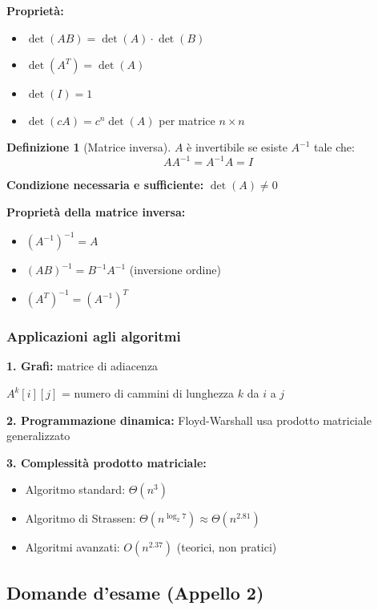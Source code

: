 \documentclass[a4paper, 11pt]{article}
\theoremstyle{definition}
\newtheorem{definizione}{Definizione}[section]
\theoremstyle{remark}
\theoremstyle{remark}
\begin{document}
	\textbf{Proprietà:}
	\begin{itemize}
		\item $\det(AB) = \det(A) \cdot \det(B)$
		\item $\det(A^T) = \det(A)$
		\item $\det(I) = 1$
		\item $\det(cA) = c^n \det(A)$ per matrice $n \times n$
	\end{itemize}
	
	\begin{definizione}[Matrice inversa]
		$A$ è invertibile se esiste $A^{-1}$ tale che:
		\[
		AA^{-1} = A^{-1}A = I
		\]
		
		\textbf{Condizione necessaria e sufficiente:} $\det(A) \neq 0$
	\end{definizione}
	
	\textbf{Proprietà della matrice inversa:}
	\begin{itemize}
		\item $(A^{-1})^{-1} = A$
		\item $(AB)^{-1} = B^{-1}A^{-1}$ (inversione ordine)
		\item $(A^T)^{-1} = (A^{-1})^T$
	\end{itemize}
	
	\subsubsection{Applicazioni agli algoritmi}
	
	\textbf{1. Grafi:} matrice di adiacenza
	
	$A^k[i][j]$ = numero di cammini di lunghezza $k$ da $i$ a $j$
	
	\textbf{2. Programmazione dinamica:} Floyd-Warshall usa prodotto matriciale generalizzato
	
	\textbf{3. Complessità prodotto matriciale:}
	\begin{itemize}
		\item Algoritmo standard: $\Theta(n^3)$
		\item Algoritmo di Strassen: $\Theta(n^{\log_2 7}) \approx \Theta(n^{2.81})$
		\item Algoritmi avanzati: $O(n^{2.37})$ (teorici, non pratici)
	\end{itemize}
	
	
	\subsection{Domande d'esame (Appello 2)}
	
\end{document}
